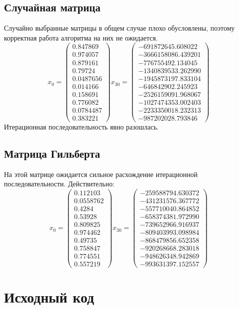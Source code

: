 \documentclass[../../report.tex]{subfiles}
\begin{document}
\subsection{Случайная матрица}
Случайно выбранные матрицы в общем случае плохо обусловлены, 
поэтому корректная работа алгоритма на них не ожидается.
\[
x_0 = 
\begin{pmatrix} 
0.847869 \\
0.974057 \\
0.879161 \\
0.79724 \\
0.0487656 \\
0.014166 \\
0.158691 \\
0.776082 \\
0.0784487 \\
0.383221 
\end{pmatrix}
x_{30} = 
\begin{pmatrix}
-691872645.608022 \\
-3666158086.439201 \\
-776755492.134045 \\
-1340839533.262990 \\
-1945873197.833104 \\
-646842902.245923 \\
-2526159091.968067 \\
-1027474353.002403 \\
-2233350018.232313 \\
-987202028.793846
\end{pmatrix}
\]
Итерационная последовательность явно разошлась.

\subsection{Матрица Гильберта}
На этой матрице ожидается сильное расхождение итерационной последовательности. Действительно:
\[
x_0 = 
\begin{pmatrix}
0.112103 \\
0.0558762 \\
0.4284 \\
0.53928 \\
0.809825 \\
0.974462 \\
0.49735 \\
0.758847 \\
0.774551 \\
0.557219
\end{pmatrix}
x_{30} = 
\begin{pmatrix}
-259588794.630372 \\
-431231576.367772 \\
-557710040.864852 \\
-658374381.972990 \\ 
-739652966.916937 \\
-809403993.098984 \\
-868479856.652358 \\
-920268668.283018 \\
-948626348.942869 \\
-993631397.152557
\end{pmatrix}
\]
\section{Исходный код}
\end{document}
